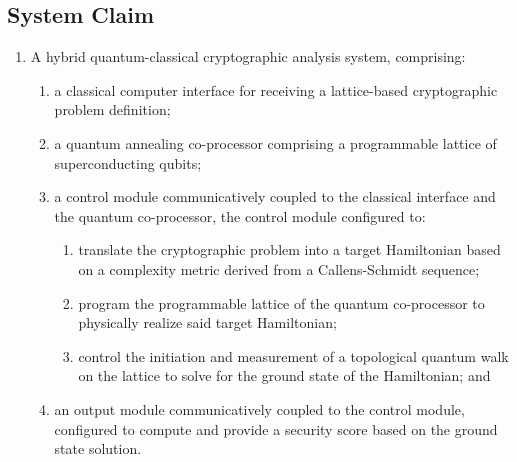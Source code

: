 \documentclass{article}
\begin{document}
\subsection{System Claim}
\begin{enumerate}
    \item[1.] A hybrid quantum-classical cryptographic analysis system, comprising:
    \begin{enumerate}
        \item[(a)] a classical computer interface for receiving a lattice-based cryptographic problem definition;
        \item[(b)] a quantum annealing co-processor comprising a programmable lattice of superconducting qubits;
        \item[(c)] a control module communicatively coupled to the classical interface and the quantum co-processor, the control module configured to:
        \begin{enumerate}
            \item[(i)] translate the cryptographic problem into a target Hamiltonian based on a complexity metric derived from a Callens-Schmidt sequence;
            \item[(ii)] program the programmable lattice of the quantum co-processor to physically realize said target Hamiltonian;
            \item[(iii)] control the initiation and measurement of a topological quantum walk on the lattice to solve for the ground state of the Hamiltonian; and
        \end{enumerate}
        \item[(d)] an output module communicatively coupled to the control module, configured to compute and provide a security score based on the ground state solution.
    \end{enumerate}
\end{enumerate}
\end{document}
